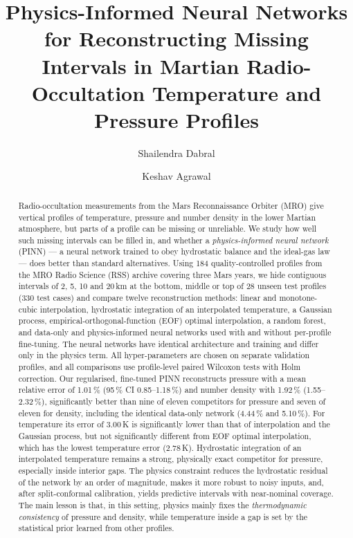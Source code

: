 \documentclass[11pt,a4paper]{article}
\title{Physics-Informed Neural Networks for Reconstructing Missing Intervals in Martian Radio-Occultation Temperature and Pressure Profiles}
\author[1]{Shailendra Dabral}
\author[1]{Keshav Agrawal}
\affil[1]{Superplan\protect\\ \texttt{shailen@superplan.md}}
\date{}
\begin{document}
\maketitle

\begin{abstract}
Radio-occultation measurements from the Mars Reconnaissance Orbiter (MRO) give vertical profiles of temperature, pressure and number density in the lower Martian atmosphere, but parts of a profile can be missing or unreliable. We study how well such missing intervals can be filled in, and whether a \emph{physics-informed neural network} (PINN) --- a neural network trained to obey hydrostatic balance and the ideal-gas law --- does better than standard alternatives. Using 184 quality-controlled profiles from the MRO Radio Science (RSS) archive covering three Mars years, we hide contiguous intervals of 2, 5, 10 and 20\,km at the bottom, middle or top of 28 unseen test profiles (330 test cases) and compare twelve reconstruction methods: linear and monotone-cubic interpolation, hydrostatic integration of an interpolated temperature, a Gaussian process, empirical-orthogonal-function (EOF) optimal interpolation, a random forest, and data-only and physics-informed neural networks used with and without per-profile fine-tuning. The neural networks have identical architecture and training and differ only in the physics term. All hyper-parameters are chosen on separate validation profiles, and all comparisons use profile-level paired Wilcoxon tests with Holm correction. Our regularised, fine-tuned PINN reconstructs pressure with a mean relative error of 1.01\,\% (95\,\% CI 0.85--1.18\,\%) and number density with 1.92\,\% (1.55--2.32\,\%), significantly better than nine of eleven competitors for pressure and seven of eleven for density, including the identical data-only network (4.44\,\% and 5.10\,\%). For temperature its error of 3.00\,K is significantly lower than that of interpolation and the Gaussian process, but not significantly different from EOF optimal interpolation, which has the lowest temperature error (2.78\,K). Hydrostatic integration of an interpolated temperature remains a strong, physically exact competitor for pressure, especially inside interior gaps. The physics constraint reduces the hydrostatic residual of the network by an order of magnitude, makes it more robust to noisy inputs, and, after split-conformal calibration, yields predictive intervals with near-nominal coverage. The main lesson is that, in this setting, physics mainly fixes the \emph{thermodynamic consistency} of pressure and density, while temperature inside a gap is set by the statistical prior learned from other profiles.
\end{abstract}
\end{document}
